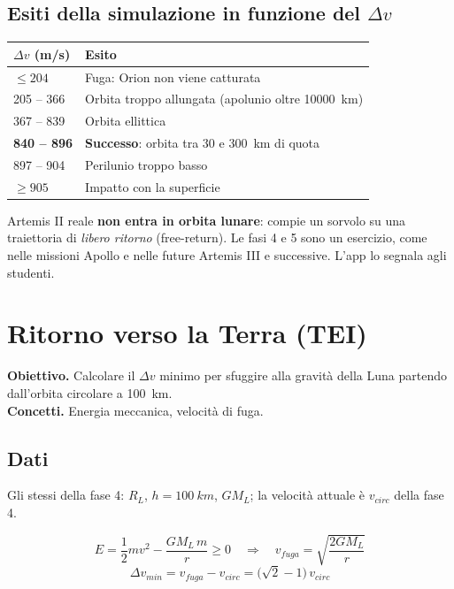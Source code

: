 \documentclass[11pt,a4paper]{article}
\newcommand{\fasenuova}{\clearpage}
\newcommand{\dv}{\Delta v}
\begin{document}
\subsection{\texorpdfstring{Esiti della simulazione in funzione del $\dv$}{Esiti della simulazione in funzione del Δv}}
{\small
\begin{tabularx}{\linewidth}{@{}l X@{}}
\toprule
$\dv$ (\si{m/s}) & Esito\\\midrule
$\le 204$ & Fuga: Orion non viene catturata\\
205 -- 366 & Orbita troppo allungata (apolunio oltre \SI{10000}{km})\\
367 -- 839 & Orbita ellittica\\
\textbf{840 -- 896} & \textbf{Successo}: orbita tra 30 e \SI{300}{km} di quota\\
897 -- 904 & Perilunio troppo basso\\
$\ge 905$ & Impatto con la superficie\\
\bottomrule
\end{tabularx}}

\begin{modello}
Artemis II reale \textbf{non entra in orbita lunare}: compie un sorvolo su una traiettoria di \emph{libero ritorno}
(free-return). Le fasi 4 e 5 sono un esercizio, come nelle missioni Apollo e nelle future Artemis III e successive.
L'app lo segnala agli studenti.
\end{modello}

\fasenuova
\section{Ritorno verso la Terra (TEI)}

\textbf{Obiettivo.} Calcolare il $\dv$ minimo per sfuggire alla gravità della Luna partendo dall'orbita circolare
a \SI{100}{km}.\\
\textbf{Concetti.} Energia meccanica, velocità di fuga.

\subsection{Dati}
Gli stessi della fase 4: $R_L$, $h = \SI{100}{km}$, $GM_L$; la velocità attuale è $v_{circ}$ della fase 4.

\begin{formule}
\[
  E = \frac12 m v^2 - \frac{GM_L\,m}{r} \ge 0
  \quad\Longrightarrow\quad
  v_{fuga} = \sqrt{\frac{2GM_L}{r}}
\]
\[
  \dv_{min} = v_{fuga} - v_{circ} = \bigl(\sqrt2 - 1\bigr)\,v_{circ}
\]
\end{formule}
\end{document}
